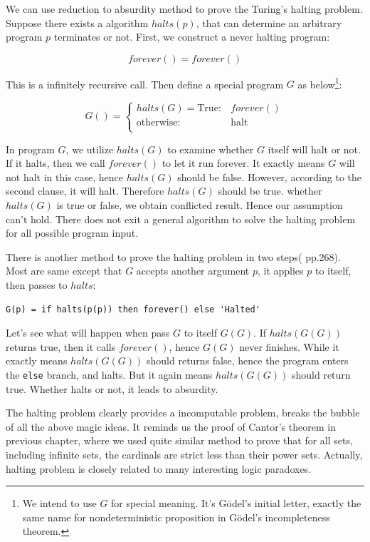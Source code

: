 \documentclass{article}
\begin{document}
We can use reduction to absurdity method to prove the Turing's halting problem. Suppose there exists a algorithm $halts(p)$, that can determine an arbitrary program $p$ terminates or not. First, we construct a never halting program:

\[
forever() = forever()
\]

This is a infinitely recursive call. Then define a special program $G$ as below\footnote{We intend to use $G$ for special meaning. It's Gödel's initial letter, exactly the same name for nondeterministic proposition in Gödel's incompleteness theorem.}:

\[
G() = \begin{cases}
halts(G) = \text{True}: & forever() \\
\text{otherwise}: & \text{halt} \\
\end{cases}
\]

In program $G$, we utilize $halts(G)$ to examine whether $G$ itself will halt or not. If it halts, then we call $forever()$ to let it run forever. It exactly means $G$ will not halt in this case, hence $halts(G)$ should be false. However, according to the second clause, it will halt. Therefore $halts(G)$ should be true. whether $halts(G)$ is true or false, we obtain conflicted result. Hence our assumption can't hold. There does not exit a general algorithm to solve the halting problem for all possible program input.

There is another method to prove the halting problem in two steps(\cite{SICP} pp.268). Most are same except that $G$ accepts another argument $p$, it applies $p$ to itself, then passes to $halts$:

\lstset{frame=single}
\begin{lstlisting}
G(p) = if halts(p(p)) then forever() else 'Halted'
\end{lstlisting}

Let's see what will happen when pass $G$ to itself $G(G)$. If $halts(G(G))$ returns true, then it calls $forever()$, hence $G(G)$ never finishes. While it exactly means $halts(G(G))$ should returns false, hence the program enters the \texttt{else} branch, and halts. But it again means $halts(G(G))$ should return true. Whether halts or not, it leads to absurdity.

The halting problem clearly provides a incomputable problem, breaks the bubble of all the above magic ideas. It reminds us the proof of Cantor's theorem in previous chapter, where we used quite similar method to prove that for all sets, including infinite sets, the cardinals are strict less than their power sets. Actually, halting problem is closely related to many interesting logic paradoxes.
\end{document}
